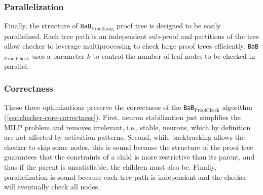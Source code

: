 \documentclass[oneside,11pt,dvipsnames]{book}
\numberwithin{equation}{section}
\theoremstyle{definition}
\theoremstyle{remark}
\newcommand{\prooflang}{\texttt{BaB$_{\text{ProofLang}}$}}
\newcommand{\proofcheck}{\texttt{BaB$_{\text{ProofCheck}}$}}
\begin{document}
\subsubsection{Parallelization} Finally, the structure of \prooflang{} proof tree is designed to be easily parallelized.  Each tree path is an independent sub-proof and partitions of the tree allow checker to leverage multiprocessing to check large proof trees efficiently. \proofcheck{} uses a parameter $k$ to control the number of leaf nodes to be checked in parallel.


\subsubsection{Correctness} These three optimizations preserve the correctness of the \proofcheck{} algorithm (\autoref{sec:checker-core-correctness}). First, neuron stabilization just simplifies the MILP problem and removes irrelevant, i.e., stable, neurons, which by definition are not affected by activation patterns. Second, while backtracking allows the checker to skip some nodes, this is sound because the structure of the proof tree guarantees that the constraints of a child is more restrictive than its parent, and thus if the parent is unsatisfiable, the children must also be. Finally, parallelization is sound because each tree path is independent and the checker will eventually check all nodes.






\end{document}
